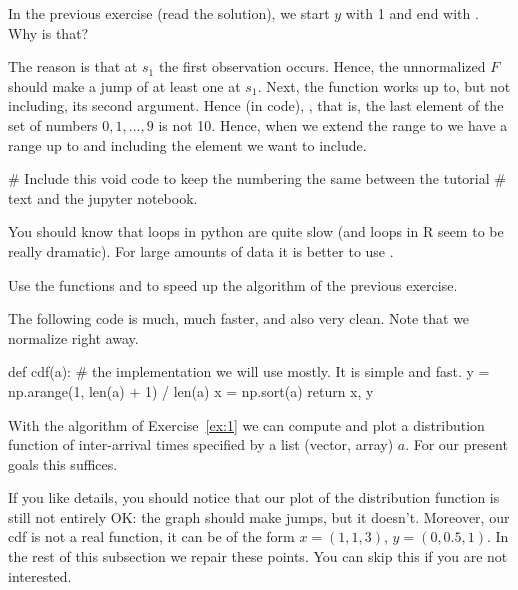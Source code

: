 \begin{exercise}
In the previous exercise (read the solution), we start $y$ with 1 and end with . Why is that?
\begin{solution}
    The reason is that at $s_1$ the first observation occurs. Hence, the unnormalized $F$ should make a jump of at least one at $s_1$. Next, the  function works up to, but not including, its second argument. Hence (in code), , that is, the last element  of the set of numbers $0, 1, \ldots, 9$ is not 10. Hence, when we extend the range to  we have a range up to and including the element we want to include.

  \begin{pyverbatim}
    # Include this void code to keep the numbering the same between the tutorial
    # text and the jupyter notebook.
\end{pyverbatim}

  \end{solution}
\end{exercise}

You should know that  loops in python are quite slow (and  loops in R seem to be really dramatic). For large amounts of data it is better to use .


\begin{exercise}\label{ex:1}
  Use the  functions  and  to speed up the algorithm of the previous exercise.
\begin{solution}
    The following code is much, much faster, and also very clean. Note that we normalize  right away.

\begin{pyverbatim}
def cdf(a):  # the implementation we will use mostly. It is simple and fast.
    y = np.arange(1, len(a) + 1) / len(a)
    x = np.sort(a)
    return x, y

\end{pyverbatim}
  \end{solution}
\end{exercise}


With the algorithm of Exercise~\ref{ex:1} we can compute and plot a distribution function of inter-arrival times specified by a list (vector, array) $a$.
For our present goals this suffices.

If you like details, you should notice that our plot of the distribution function is still not entirely OK: the graph should make jumps, but it doesn't.
Moreover, our cdf is not a real function, it can be of the form $x=(1,1,3)$, $y=(0, 0.5, 1)$.
In the rest of this subsection we repair these points.
You can skip this if you are not interested.

